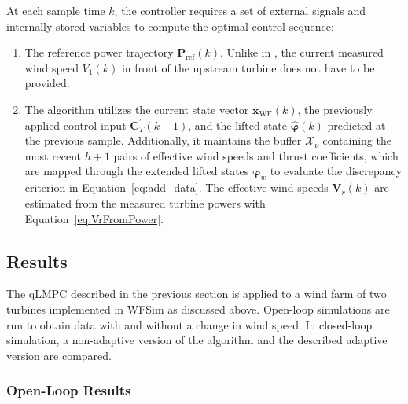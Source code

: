 %
At each sample time $k$, the controller requires a set of external signals and internally stored variables to compute the optimal control sequence:
\begin{enumerate}
    \item The reference power trajectory $\bm{P}_{\text{ref}}(k)$. Unlike in \cite{dittmer2022data}, the current measured wind speed $V_{1}(k)$ in front of the upstream turbine does not have to be provided.
    
    \item The algorithm utilizes the current state vector $\bm{x}_{\text{WF}}(k)$, the previously applied control input $\bm{C}_T^\prime(k-1)$, and the lifted state $\hat{\bm{\varphi}}(k)$ predicted at the previous sample. Additionally, it maintains the buffer $\mathcal{X}_{\nu}$ containing the most recent $h+1$ pairs of effective wind speeds and thrust coefficients, which are mapped through the extended lifted states $\bm{\varphi}_w$ to evaluate the discrepancy criterion in Equation~\eqref{eq:add_data}. The effective wind speeds $\tilde{\bm{V}}_r(k)$ are estimated from the measured turbine powers with Equation~\eqref{eq:VrFromPower}.
\end{enumerate}

\subsection{Results} \label{section:AICWindFarmControl}
The qLMPC described in the previous section is applied to a wind farm of two turbines implemented in WFSim as discussed above. Open-loop simulations are run to obtain data with and without a change in wind speed. In closed-loop simulation, a non-adaptive version of the algorithm and the described adaptive version are compared.

\subsubsection{Open-Loop Results}

